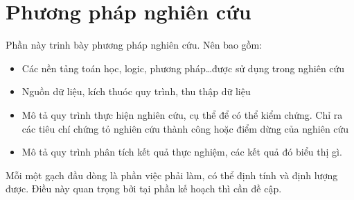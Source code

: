 \section{Phương pháp nghiên cứu}
\label{method}

Phần này trinh bày phương pháp nghiên cứu. Nên bao gồm: 

\begin{itemize}
    \item Các nền tảng toán học, logic, phương pháp\dots được sử dụng trong nghiên cứu
    \item Nguồn dữ liệu, kích thuóc quy trình, thu thập dữ liệu
    \item Mô tả quy trình thực hiện nghiên cứu, cụ thể để có thể kiểm chứng. Chỉ ra các tiêu chí chứng tỏ nghiên cứu thành công hoặc điểm dừng của nghiên cứu
    \item Mô tả quy trình phân tích kết quả thực nghiệm, các kết quả đó biểu thị gì.
\end{itemize}

Mỗi một gạch đầu dòng là phần việc phải làm, có thể định tính và định lượng được. Điều này quan trọng bởi tại phần kế hoạch thì cần đề cập.